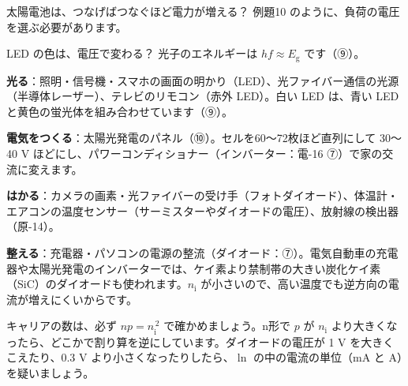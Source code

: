 \begin{tsumazuki}{太陽電池は、つなげばつなぐほど電力が増える？}
例題10 のように、負荷の電圧を選ぶ必要があります。
\end{tsumazuki}

\begin{tsumazuki}{LED の色は、電圧で変わる？}
光子のエネルギーは $hf\approx E_{\mathrm g}$ です（⑨）。
\end{tsumazuki}


\begin{phkougaku}[光と電気を行き来する部品]
\textbf{光る}：照明・信号機・スマホの画面の明かり（LED）、光ファイバー通信の光源（半導体レーザー）、テレビのリモコン（赤外 LED）。白い LED は、青い LED と黄色の蛍光体を組み合わせています（⑨）。

\textbf{電気をつくる}：太陽光発電のパネル（⑩）。セルを60〜72枚ほど直列にして 30〜40 V ほどにし、パワーコンディショナー（インバーター：電-16 ⑦）で家の交流に変えます。

\textbf{はかる}：カメラの画素・光ファイバーの受け手（フォトダイオード）、体温計・エアコンの温度センサー（サーミスターやダイオードの電圧）、放射線の検出器（原-14）。

\textbf{整える}：充電器・パソコンの電源の整流（ダイオード：⑦）。電気自動車の充電器や太陽光発電のインバーターでは、ケイ素より禁制帯の大きい炭化ケイ素（SiC）のダイオードも使われます。$n_{\mathrm i}$ が小さいので、高い温度でも逆方向の電流が増えにくいからです。

\begin{phketa}[半導体の数の目安]
キャリアの数は、必ず $np=n_{\mathrm i}^{\,2}$ で確かめましょう。n形で $p$ が $n_{\mathrm i}$ より大きくなったら、どこかで割り算を逆にしています。ダイオードの電圧が 1 V を大きくこえたり、0.3 V より小さくなったりしたら、$\ln$ の中の電流の単位（mA と A）を疑いましょう。
\end{phketa}
\end{phkougaku}

